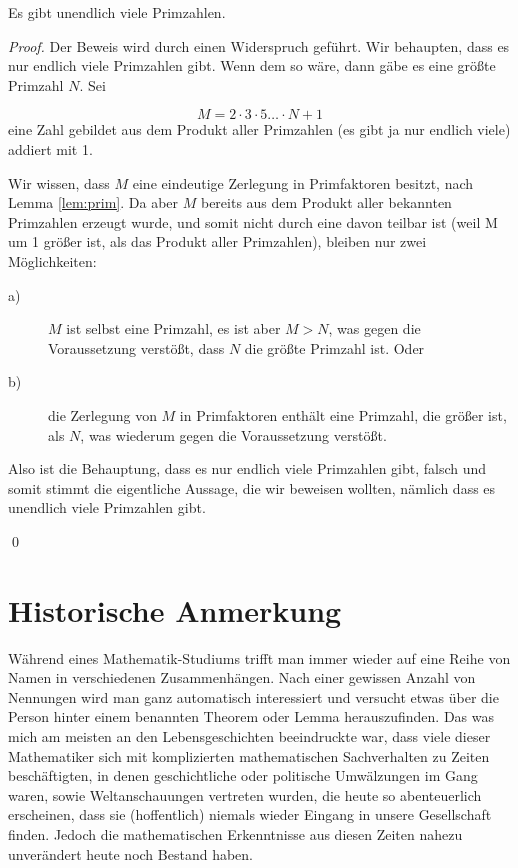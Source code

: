 \begin{theorem}
Es gibt unendlich viele Primzahlen.
\end{theorem}
\begin{proof}
Der Beweis wird durch einen Widerspruch geführt. Wir behaupten, dass es nur endlich viele Primzahlen gibt. Wenn dem so wäre, dann gäbe es eine größte Primzahl $N$. Sei

\[ M = 2\cdot 3\cdot 5\dots \cdot N +1 \]
eine Zahl gebildet aus dem Produkt aller Primzahlen (es gibt ja nur endlich viele) addiert mit 1.

Wir wissen, dass $M$ eine eindeutige Zerlegung in Primfaktoren besitzt, nach Lemma \ref{lem:prim}. Da aber $M$ bereits aus dem Produkt aller bekannten Primzahlen erzeugt wurde, und somit nicht durch eine davon teilbar ist (weil M um 1 größer ist, als das Produkt aller Primzahlen), bleiben nur zwei Möglichkeiten: 

\begin{description}
\item[a)] $M$ ist selbst eine Primzahl, es ist aber $M>N$, was gegen die Voraussetzung verstößt, dass $N$ die größte Primzahl ist. Oder
\item[b)] die Zerlegung von $M$ in Primfaktoren enthält eine Primzahl, die größer ist, als $N$, was wiederum gegen die Voraussetzung verstößt.
\end{description}

Also ist die Behauptung, dass es nur endlich viele Primzahlen gibt, falsch und somit stimmt die eigentliche Aussage, die wir beweisen wollten, nämlich dass es unendlich viele Primzahlen gibt. 

\qed
\end{proof}


\section{Historische Anmerkung}

Während eines Mathematik-Studiums trifft man immer wieder auf eine Reihe von Namen in verschiedenen Zusammenhängen. Nach einer gewissen Anzahl von Nennungen wird man ganz automatisch interessiert und versucht etwas über die Person hinter einem benannten Theorem oder Lemma herauszufinden. Das was mich am meisten an den Lebensgeschichten beeindruckte war, dass viele dieser Mathematiker sich mit komplizierten mathematischen Sachverhalten zu Zeiten beschäftigten, in denen geschichtliche oder politische Umwälzungen im Gang waren, sowie Weltanschauungen vertreten wurden, die heute so abenteuerlich erscheinen, dass sie (hoffentlich) niemals wieder Eingang in unsere Gesellschaft finden. Jedoch die mathematischen Erkenntnisse aus diesen Zeiten nahezu unverändert heute noch Bestand haben. 

